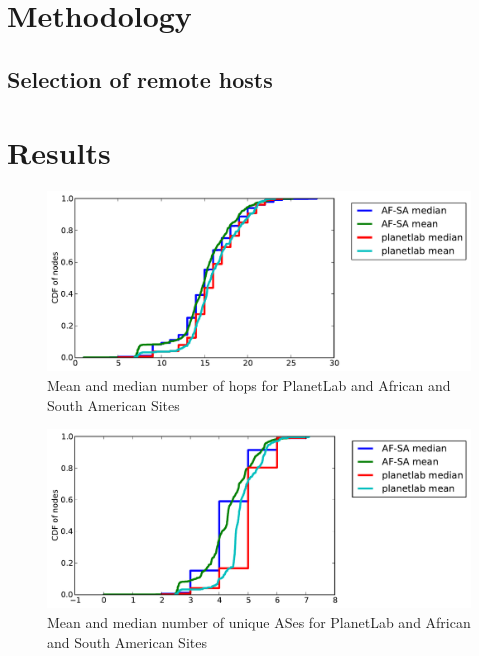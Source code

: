 \documentclass{sig-alternate-10pt}
\begin{document}
\section{Methodology}

\subsection{Selection of remote hosts}

\section{Results}

\begin{figure}
\centering
    \includegraphics[width=1.0\linewidth]{figs/number_of_hops.pdf}
    \caption{Mean and median number of hops for PlanetLab and African
and South American Sites}
\end{figure}


\begin{figure}
\centering
    \includegraphics[width=1.0\linewidth]{figs/number_of_ases.pdf}
    \caption{Mean and median number of unique ASes for PlanetLab and African
and South American Sites}
\end{figure}
\end{document}
